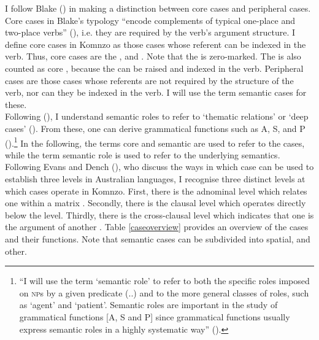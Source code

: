 I follow Blake (\citeyear{Blake:case}) in making a distinction between core cases and peripheral cases. Core cases in Blake's typology ``encode complements of typical one-place and two-place  verbs'' (\citeyear[32]{Blake:case}), i.e. they are required by the verb's argument structure. I define core cases in Komnzo as those cases whose referent can be indexed in the verb. Thus, core cases are the ,  and  . Note that the  is zero-marked. The  is also counted as core , because the  can be raised and indexed in the verb. Peripheral cases are those cases whose referents are not required by the structure of the verb, nor can they be indexed in the verb. I will use the term semantic cases for these.\\ 

Following (\citealt{Andrews:2007nounphrase}), I understand semantic roles to refer to `thematic relations' or `deep cases' (\citealt{Fillmore:1968case}). From these, one can derive grammatical functions such as A, S, and P (\citealt{Dixon:1972dyirbal}).\footnote{``I will use the term ‘semantic role’ to refer to both the specific roles imposed on \textsc{np}s by a given predicate (..) and to the more general classes of roles, such as ‘agent’ and ‘patient’. Semantic roles are important in the study of grammatical functions [A, S and P] since grammatical functions usually express semantic roles in a highly systematic way'' (\citealt[136]{Andrews:2007nounphrase}).} In the following, the terms core  and semantic  are used to refer to the cases, while the term semantic role is used to refer to the underlying semantics.\\

Following Evans and Dench (\citeyear{Evans:1988ge}), who discuss the ways in which case can be used to establish three levels in Australian languages, I recognise three distinct levels at which cases operate in Komnzo. First, there is the adnominal level which relates one  within a matrix . Secondly, there is the clausal level which operates directly below the  level. Thirdly, there is the cross-clausal level which indicates that one  is the argument of another . Table \ref{caseoverview} provides an overview of the cases and their functions. Note that semantic cases can be subdivided into spatial,  and other.

